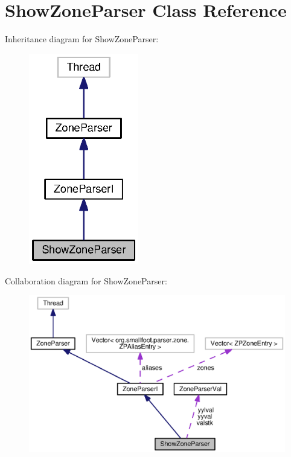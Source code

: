 \section{Show\-Zone\-Parser Class Reference}
\label{classorg_1_1smallfoot_1_1parser_1_1zone_1_1ShowZoneParser}


Inheritance diagram for Show\-Zone\-Parser\-:\nopagebreak
\begin{figure}[H]
\begin{center}
\leavevmode
\includegraphics[width=136pt]{classorg_1_1smallfoot_1_1parser_1_1zone_1_1ShowZoneParser__inherit__graph}
\end{center}
\end{figure}


Collaboration diagram for Show\-Zone\-Parser\-:\nopagebreak
\begin{figure}[H]
\begin{center}
\leavevmode
\includegraphics[width=350pt]{classorg_1_1smallfoot_1_1parser_1_1zone_1_1ShowZoneParser__coll__graph}
\end{center}
\end{figure}
